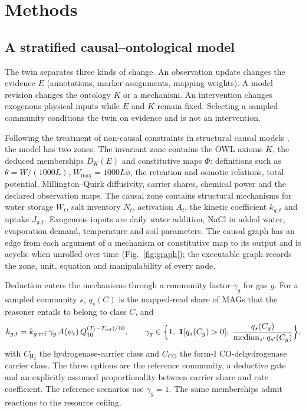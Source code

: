 \documentclass[11pt,a4paper]{article}
\begin{document}
\section{Methods}
\subsection{A stratified causal--ontological model}
The twin separates three kinds of change. An observation update changes the evidence $E$ (annotations, marker assignments, mapping weights). A model revision changes the ontology $K$ or a mechanism. An intervention changes exogenous physical inputs while $E$ and $K$ remain fixed. Selecting a sampled community conditions the twin on evidence and is not an intervention.

Following the treatment of non-causal constraints in structural causal models \cite{bochman2015pearls,pearl2009causality}, the model has two zones. The invariant zone contains the OWL axioms $K$, the deduced memberships $D_K(E)$ and constitutive maps $\Phi$: definitions such as $\theta=W/(1000L)$, $W_{\max}=1000L\phi$, the retention and osmotic relations, total potential, Millington--Quirk diffusivity, carrier shares, chemical power and the declared observation maps. The causal zone contains structural mechanisms for water storage $W_t$, salt inventory $N_t$, activation $A_t$, the kinetic coefficient $k_{g,t}$ and uptake $J_{g,t}$. Exogenous inputs are daily water addition, NaCl in added water, evaporation demand, temperature and soil parameters. The causal graph has an edge from each argument of a mechanism or constitutive map to its output and is acyclic when unrolled over time (Fig.~\ref{fig:graph}); the executable graph records the zone, unit, equation and manipulability of every node.

Deduction enters the mechanisms through a community factor $\gamma_g$ for gas $g$. For a sampled community $s$, $q_s(C)$ is the mapped-read share of MAGs that the reasoner entails to belong to class $C$, and
\begin{equation}
k_{g,t}=k_{g,\mathrm{ref}}\,\gamma_g\,A(\psi_t)\,Q_{10}^{(T_t-T_{\mathrm{ref}})/10},\qquad
\gamma_g\in\Bigl\{1,\;\mathbf{1}[q_s(C_g)>0],\;\frac{q_s(C_g)}{\operatorname{median}_{s'}q_{s'}(C_g)}\Bigr\},
\end{equation}
with $C_{\mathrm{H_2}}$ the hydrogenase-carrier class and $C_{\mathrm{CO}}$ the form-I CO-dehydrogenase carrier class. The three options are the reference community, a deductive gate and an explicitly assumed proportionality between carrier share and rate coefficient. The reference scenarios use $\gamma_g=1$. The same memberships admit reactions to the resource ceiling.
\end{document}
